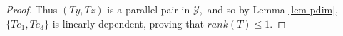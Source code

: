 \documentclass{amsart}
\theoremstyle{definition}
\theoremstyle{remark}
\numberwithin{equation}{section}
\begin{document}
\begin{proof}
Thus $(Ty,Tz)$ is a parallel pair in $\mathcal{Y},$ and so by Lemma \ref{lem-pdim}, $\{Te_1,Te_3\}$ is linearly dependent, proving that $rank(T)\leq 1.$ 
	\end{proof}
\end{document}
